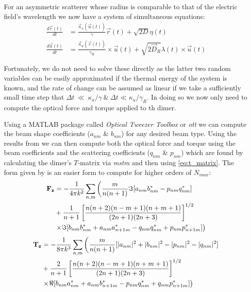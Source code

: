 For an asymmetric scatterer whose radius is comparable to that of the 
electric field's wavelength we now have a system of simultaneous equations:
\begin{align}
	\label{eq:full_langevin}
  \frac{{d}\vec{r}(t)}{{dt}}
  &=
    \frac{\vec{\kappa}_x(\vec{u}(t))}{\gamma}\vec{r}(t) + \sqrt{2D}\eta(t)
  \\
  \frac{{d}\vec{u}(t)}{{dt}}
  &=
    \frac{\vec{\kappa}_u(\vec{r}(t))}{\gamma_R}\times \vec{u}(t)
    + \sqrt{2\vec{D}_R}\lambda(t)\times \vec{u}(t)
\end{align}

Fortunately, we do not need to solve these directly as the latter two
random variables can be easily approximated if the thermal energy of
the system is known, and the rate of change can be assumed as linear if
we take a sufficiently small time step that $\Delta t~\ll~\kappa_x/\gamma 
\ \& \ \Delta t \ll \kappa_u/\gamma_R$. In doing so we now only need 
to compute the optical force and torque applied to th dimer. 

Using a  MATLAB package called \textit{Optical Tweezer Toolbox} or \textit{ott} \cite{Nieminen2007} we can compute the beam shape coefficients ($a_{nm}$ \& $b_{nm}$)
for any desired beam type. Using the results from \cite{Farsund1996} we can then 
compute both the optical force and torque using the beam coefficients and the 
scattering coefficients ($q_{nm}$ \& $p_{nm}$) which are found by calculating
the dimer's $T$-matrix via \textit{mstm} \cite{Mackowski2011} and then using \eqref{eq:t_matrix}. The form given by \cite{Crichton2000THEMD} is an easier 
form to compute for higher orders of $N_{max}$:
\begin{equation}
	\label{eq:optical_force}
\begin{split}
  \bold{F_z}
  &=
    -\frac{1}{4\pi k^2}\sum_{n,m} \left(\frac{m}{n(n+1)}\Im[a_{nm}b^*_{nm}-p_{nm}q^*_{nm}] \right.
  \\ 
  &+\frac{1}{n+1}\left[\frac{n(n+2)(n-m+1)(n+m+1)}{(2n+1)(2n+3)} \right]^{1/2}
  \\
  & \left.\times\Im[b_{nm}b^*_{nm}+a_{nm}a^*_{n+1m}-q_{nm}q^*_{nm}+p_{nm}p^*_{n+1m}] \right)
\end{split}
\end{equation}
\begin{equation}
\begin{split}
  \bold{T_z}
  &=
    -\frac{1}{8\pi k^3}\sum_{n,m} \left(\frac{m}{n(n+1)}[|a_{nm}|^2+|b_{nm}|^2-|p_{nm}|^2-|q_{nm}|^2] \right.
  \\ 
  &+\frac{2}{n+1}\left[\frac{n(n+2)(n-m+1)(n+m+1)}{(2n+1)(2n+3)} \right]^{1/2}
  \\
  & \left.\times\Re[b_{nm}a^*_{nm}+a_{nm}b^*_{n+1m}-p_{nm}q^*_{nm}+q_{nm}p^*_{n+1m}] \right)
\end{split}
\end{equation}

